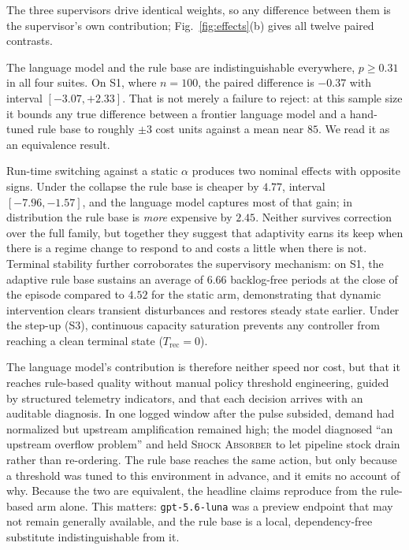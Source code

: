 \documentclass[conference]{IEEEtran}
\begin{document}
The three supervisors drive identical weights, so any difference between
them is the supervisor's own contribution; Fig.~\ref{fig:effects}(b) gives
all twelve paired contrasts.

The language model and the rule base are indistinguishable everywhere,
$p \geq 0.31$ in all four suites. On S1, where $n=100$, the paired
difference is $-0.37$ with interval $[-3.07, +2.33]$. That is not merely a
failure to reject: at this sample size it bounds any true difference between
a frontier language model and a hand-tuned rule base to roughly $\pm 3$ cost
units against a mean near $85$. We read it as an equivalence result.

Run-time switching against a static $\alpha$ produces two nominal effects
with opposite signs. Under the collapse the rule base is cheaper by $4.77$,
interval $[-7.96, -1.57]$, and the language model captures most of that
gain; in distribution the rule base is \emph{more} expensive by $2.45$.
Neither survives correction over the full family, but together they suggest
that adaptivity earns its keep when there is a regime change to respond to
and costs a little when there is not. Terminal stability further corroborates the supervisory mechanism:
on S1, the adaptive rule base sustains an average of $6.66$ backlog-free
periods at the close of the episode compared to $4.52$ for the static arm,
demonstrating that dynamic intervention clears transient disturbances and
restores steady state earlier. Under the step-up (S3), continuous capacity
saturation prevents any controller from reaching a clean terminal state ($T_{\text{rec}} = 0$).

The language model's contribution is therefore neither speed nor cost, but
that it reaches rule-based quality without manual policy threshold engineering,
guided by structured telemetry indicators, and that each decision arrives with
an auditable diagnosis. In one logged
window after the pulse subsided, demand had normalized but upstream
amplification remained high; the model diagnosed ``an upstream overflow
problem'' and held \textsc{Shock Absorber} to let pipeline stock drain
rather than re-ordering. The rule base reaches the same action, but only
because a threshold was tuned to this environment in advance, and it emits
no account of why. Because the two are equivalent, the headline claims
reproduce from the rule-based arm alone. This matters: \texttt{gpt-5.6-luna}
was a preview endpoint that may not remain generally available, and the rule
base is a local, dependency-free substitute indistinguishable from it.
\end{document}

